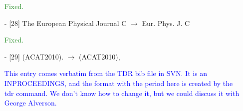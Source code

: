 \documentclass[paper=a4, fontsize=11pt]{scrartcl}
\begin{document}
\begin{itemize}
\textcolor{ForestGreen}{Fixed.}

\item [-]  [28] The European Physical Journal C  $\rightarrow$ Eur. Phys. J. C

\textcolor{ForestGreen}{Fixed.}

\item  [-] [29] (ACAT2010). $\rightarrow$ (ACAT2010),

\textcolor{blue}{This entry comes verbatim from the TDR bib file in SVN.
It is an INPROCEEDINGS, and the format with the period here is created by the tdr command.
We don't know how to change it, but we could discuss it with George Alverson.}


\end{itemize}
\end{document}
